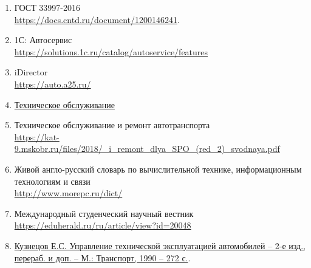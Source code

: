 \begin{enumerate}
	\item ГОСТ 33997-2016 \\
	\url{https://docs.cntd.ru/document/1200146241}.
		\label{ref:ГОСТ-требования-то}

	\item 1С: Автосервис\\
		\url{https://solutions.1c.ru/catalog/autoservice/features}
		\label{ref:1С-автосервис}

	\item iDirector\\
		\url{https://auto.a25.ru/}
		\label{ref:iDirector}

	\item \href{http://абсолютпб.рф/техническое-обслуживание}{Техническое
		обслуживание}
		\label{ref:техническое-обслуживание}

	\item Техническое обслуживание и ремонт автотранспорта \\
		\url{https://kat-9.mskobr.ru/files/2018/_i_remont_dlya_SPO_(red_2)_svodnaya.pdf}
		\label{ref:му-ремонт-и-техническое-обслуживание}

	\item Живой англо-русский словарь по вычислительной технике, информационным технологиям и связи\\
		\url{http://www.morepc.ru/dict/}
		\label{ref:календарное-планирование}

	\item Международный студенческий научный вестник\\
		\url{https://eduherald.ru/ru/article/view?id=20048}
		\label{ref:er-диаграммы}

    \item \href{http://rusautomobile.ru/wp-content/uploads/dop_materials/books/03.12.2015/6/KuznetsovESUpravlenietehnicheskojekspluatatsiejavtomobilej(MTransport1990).pdf}{Кузнецов Е.С. Управление технической эксплуатацией автомобилей --
        2-е изд., перераб. и доп. -- М.: Транспорт, 1990 -- 272 с.}.
        \label{ref:кузнецов}

\end{enumerate}

